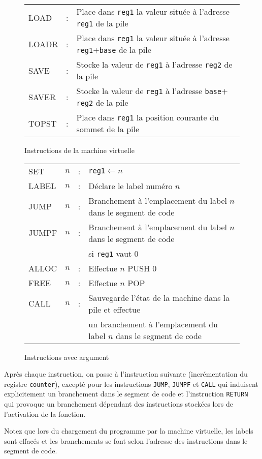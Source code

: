 \documentclass[12pt,a4paper]{article}
\begin{document}
\begin{figure}
\begin{tabular}{lll}
    LOAD &:& Place dans {\tt reg1} la valeur située à l'adresse {\tt reg1}
    de la pile\\
    LOADR &:& Place dans {\tt reg1} la valeur située à l'adresse
    {\tt reg1}$+${\tt base} de la pile\\
    SAVE &:& Stocke la valeur de {\tt reg1} à l'adresse {\tt reg2} de la pile\\
    SAVER&:& Stocke la valeur de {\tt reg1} à l'adresse {\tt base}$+${\tt reg2} de la pile\\
    TOPST &:& Place dans {\tt reg1} la position courante du sommet de la pile
  \end{tabular}
  
  \caption{Instructions de la machine virtuelle}
  \label{fig:instruct}
\end{figure}

\begin{figure}
  \centering
  \begin{tabular}{llll}
    SET   &$n$&:& {\tt reg1}$\leftarrow n$\\
    LABEL &$n$&:& Déclare le label numéro $n$\\
    JUMP  &$n$&:& Branchement à l'emplacement du label $n$ dans le segment de code\\
    JUMPF &$n$&:& Branchement à l'emplacement du label $n$ dans le segment de code\\
    &&& si {\tt reg1} vaut $0$\\
    ALLOC &$n$&:& Effectue $n$ PUSH $0$ \\
    FREE  &$n$&:& Effectue $n$ POP\\
    CALL  &$n$&:& Sauvegarde l'état de la machine dans la pile et effectue \\
    &&& un branchement à l'emplacement du label $n$ dans le segment de code\\
  \end{tabular}
  \caption{Instructions avec argument}
\label{fig:instructarg}
\end{figure}

Après chaque instruction, on passe à l'instruction suivante
(incrémentation du registre {\tt counter}), excepté
pour les instructions {\tt JUMP}, {\tt JUMPF} et {\tt CALL} qui
induisent explicitement un branchement dans le segment de code
et l'instruction {\tt RETURN} qui provoque un branchement dépendant
des instructions stockées lors de l'activation de la fonction.

Notez que lors du chargement du programme par la machine virtuelle,
les labels sont effacés et les branchements se font selon l'adresse
des instructions dans le segment de code.
\end{document}
